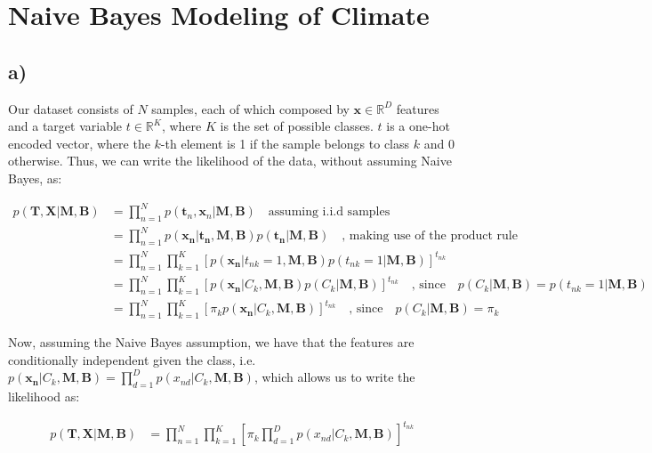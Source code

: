 \documentclass[12pt,a4paper,oneside]{paper}
\begin{document}
\pagestyle{plain}


\def\title {Homework Assignment 2}

 
\cleardoublepage
{}\selectfont
\setcounter{page}{0}
\tableofcontents
\newpage

\small

\section{Naive Bayes Modeling of Climate}

\subsection*{a)}

Our dataset consists of $N$ samples, each of which composed by $\bm{x} \in \mathbb{R}^{D}$ features
and a target variable $t \in \mathbb{R}^K$, where $K$ is the set of possible classes. $t$ is a one-hot encoded vector,
where the $k$-th element is 1 if the sample belongs to class $k$ and 0 otherwise.
Thus, we can write the likelihood of the data, without assuming Naive Bayes, as:

\begin{align*}
    p(\bm{T}, \bm{X} | \bm{M}, \bm{B}) &= \prod_{n=1}^{N} p(\bm{t}_n, \bm{x}_n | \bm{M}, \bm{B}) \quad \text{assuming i.i.d samples} \\
    &= \prod_{n=1}^{N} p(\bm{x_n} | \bm{t_n}, \bm{M}, \bm{B}) p(\bm{t_n} | \bm{M}, \bm{B}) \quad \text{, making use of the product rule} \\
    &= \prod_{n=1}^{N} \prod_{k=1}^{K} [p(\bm{x_n} | t_{nk} = 1, \bm{M}, \bm{B}) p(t_{nk} = 1 | \bm{M}, \bm{B})]^{t_{nk}} \\
    &= \prod_{n=1}^{N} \prod_{k=1}^{K} [p(\bm{x_n} | C_k, \bm{M}, \bm{B}) p(C_k | \bm{M}, \bm{B})]^{t_{nk}} \quad \text{, since} \quad p(C_k | \bm{M}, \bm{B}) = p(t_{nk} = 1 | \bm{M}, \bm{B}) \\
    &= \prod_{n=1}^{N} \prod_{k=1}^{K} [\pi_k p(\bm{x_n} | C_k, \bm{M}, \bm{B})]^{t_{nk}} \quad \text{, since} \quad p(C_k | \bm{M}, \bm{B}) = \pi_k
\end{align*}

Now, assuming the Naive Bayes assumption, we have that the features are conditionally independent given the class, i.e. $p(\bm{x_n} | C_k, \bm{M}, \bm{B}) = \prod_{d=1}^{D} p(x_{nd} | C_k, \bm{M}, \bm{B})$, 
which allows us to write the likelihood as:

\begin{align*}
    p(\bm{T}, \bm{X} | \bm{M}, \bm{B}) &= \prod_{n=1}^{N} \prod_{k=1}^{K} [\pi_k \prod_{d=1}^{D} p(x_{nd} | C_k, \bm{M}, \bm{B})]^{t_{nk}}
\end{align*}
\end{document}
